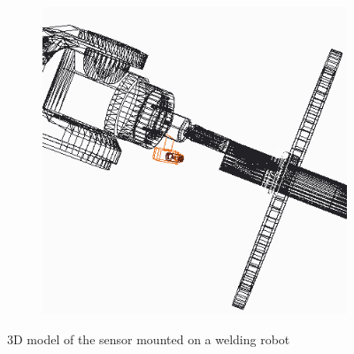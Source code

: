 \begin{figure}[h]
\begin{subfigure}[b]{0.3\textwidth}
\includegraphics[width=\textwidth]{graphics/CAD3}
\end{subfigure}
\caption{3D model of the sensor mounted on a welding robot}
\label{concept_cad}
\end{figure}